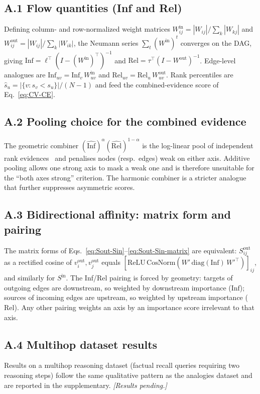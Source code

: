 \documentclass[table, 11pt]{article}
\begin{document}
\subsection*{A.1 Flow quantities (Inf and Rel)}\label{app:flow}

Defining column- and row-normalized weight matrices
$W^{\text{in}}_{ij} = |W_{ij}|/\sum_k |W_{kj}|$ and
$W^{\text{out}}_{ij} = |W_{ij}|/\sum_k |W_{ik}|$, the Neumann series
$\sum_t (W^{\text{in}})^t$ converges on the DAG, giving
$\mathrm{Inf} = \ell^\top (I - (W^{\text{in}})^\top)^{-1}$ and
$\mathrm{Rel} = \tau^\top (I - W^{\text{out}})^{-1}$. Edge-level
analogues are $\mathrm{Inf}_{uv} = \mathrm{Inf}_v\,W^{\text{in}}_{uv}$
and $\mathrm{Rel}_{uv} = \mathrm{Rel}_u\,W^{\text{out}}_{uv}$. Rank
percentiles are $\widehat{s}_u = |\{v : s_v < s_u\}|/(N-1)$ and feed
the combined-evidence score of Eq.~\eqref{eq:CV-CE}.

\subsection*{A.2 Pooling choice for the combined evidence}\label{app:pooling}

The geometric combiner $(\widehat{\mathrm{Inf}})^\alpha
(\widehat{\mathrm{Rel}})^{1-\alpha}$ is the log-linear pool of
independent rank evidences~\cite{genest1986combining} and penalises
nodes (resp.\ edges) weak on either axis. Additive pooling allows one
strong axis to mask a weak one and is therefore unsuitable for the
``both axes strong'' criterion. The harmonic combiner is a stricter
analogue that further suppresses asymmetric scores.

\subsection*{A.3 Bidirectional affinity: matrix form and pairing}\label{app:affinity}

The matrix forms of Eqs.~\eqref{eq:Sout-Sin}--\eqref{eq:Sout-Sin-matrix}
are equivalent: $S^{\text{out}}_{ij}$ as a rectified cosine of
$v_i^{\text{out}}, v_j^{\text{out}}$ equals
$[\mathrm{ReLU}\,\mathrm{CosNorm}(W'\,\mathrm{diag}(\mathrm{Inf})\,W'^\top)]_{ij}$,
and similarly for $S^{\text{in}}$. The Inf/Rel pairing is forced by
geometry: targets of outgoing edges are downstream, so weighted by
downstream importance ($\mathrm{Inf}$); sources of incoming edges are
upstream, so weighted by upstream importance ($\mathrm{Rel}$). Any
other pairing weights an axis by an importance score irrelevant to
that axis.

\subsection*{A.4 Multihop dataset results}\label{app:multihop}

Results on a multihop reasoning dataset (factual recall queries
requiring two reasoning steps) follow the same qualitative pattern
as the analogies dataset and are reported in the supplementary.
\textit{[Results pending.]}
\end{document}
